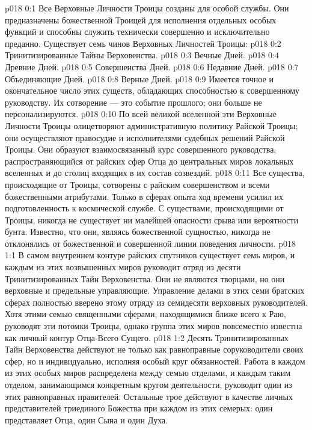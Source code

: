 \author{Божественный Советник}
\vs p018 0:1 Все Верховные Личности Троицы созданы для особой службы. Они предназначены божественной Троицей для исполнения отдельных особых функций и способны служить технически совершенно и исключительно преданно. Существует семь чинов Верховных Личностей Троицы:
\vs p018 0:2 \bibnobreakspace Тринитизированные Тайны Верховенства.
\vs p018 0:3 \bibnobreakspace Вечные Дней.
\vs p018 0:4 \bibnobreakspace Древние Дней.
\vs p018 0:5 \bibnobreakspace Совершенства Дней.
\vs p018 0:6 \bibnobreakspace Недавние Дней.
\vs p018 0:7 \bibnobreakspace Объединяющие Дней.
\vs p018 0:8 \bibnobreakspace Верные Дней.
\vs p018 0:9 \pc Имеется точное и окончательное число этих существ, обладающих способностью к совершенному руководству. Их сотворение --- это событие прошлого; они больше не персонализируются.
\vs p018 0:10 По всей великой вселенной эти Верховные Личности Троицы олицетворяют административную политику Райской Троицы; они осуществляют правосудие и  исполнителями судебных решений Райской Троицы. Они образуют взаимосвязанный курс совершенного руководства, распространяющийся от райских сфер Отца до центральных миров локальных вселенных и до столиц входящих в их состав созвездий.
\vs p018 0:11 Все существа, происходящие от Троицы, сотворены с райским совершенством и всеми божественными атрибутами. Только в сферах опыта ход времени усилил их подготовленность к космической службе. С существами, происходящими от Троицы, никогда не существует ни малейшей опасности срыва или вероятности бунта. Известно, что они, являясь божественной сущностью, никогда не отклонялись от божественной и совершенной линии поведения личности.
\vs p018 1:1 В самом внутреннем контуре райских спутников существует семь миров, и каждым из этих возвышенных миров руководит отряд из десяти Тринитизированных Тайн Верховенства. Они не являются творцами, но они верховные и предельные управляющие. Управление делами в этих семи братских сферах полностью вверено этому отряду из семидесяти верховных руководителей. Хотя этими семью священными сферами, находящимися ближе всего к Раю, руководят эти потомки Троицы, однако группа этих миров повсеместно известна как личный контур Отца Всего Сущего.
\vs p018 1:2 Десять Тринитизированных Тайн Верховенства действуют не только как равноправные соруководители своих сфер, но и индивидуально, исполняя особый круг обязанностей. Работа в каждом из этих особых миров распределена между семью отделами, и каждым таким отделом, занимающимся конкретным кругом деятельности, руководит один из этих равноправных правителей. Остальные трое действуют в качестве личных представителей триединого Божества при каждом из этих семерых: один представляет Отца, один Сына и один Духа.
